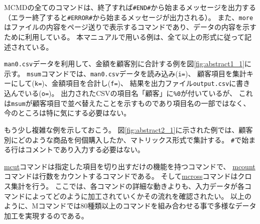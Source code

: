 

MCMDの全てのコマンドは、終了すれば\verb|#END#|から始まるメッセージを出力する
（エラー終了すると\verb|#ERROR#|から始まるメッセージが出力される）。
また、\verb|more|はファイルの内容をページ送りで表示するコマンドであり、データの内容を示すために利用している。
本マニュアルで用いる例は、全て以上の形式に従って記述されている。


\verb|man0.csv|データを利用して、金額を顧客別に合計する例を図\ref{fig:abstract1_1}に示す。
\verb|msum|コマンドでは、\verb|man0.csv|データを読み込み(\verb|i=|)、
顧客項目を集計キーにして(\verb|k=|)、金額項目を合計し(\verb|f=|)、
結果を出力ファイル\verb|output.csv|に書き込んでいる(\verb|o=|)。
出力されたCSVの項目名「顧客」に\verb|%0|が付いているが、
これは\verb|msum|が顧客項目で並べ替えたことを示すものであり項目名の一部ではなく、
今のところは特に気にする必要はない。




もう少し複雑な例を示しておこう。
図\ref{fig:abstract2_1}に示された例では、顧客別にどのような商品を何個購入したか、マトリックス形式で集計する。
\verb|#|で始まる行はコメントであり入力する必要はない。


\hyperref[sect:mcut]{mcut}コマンドは指定した項目を切り出すだけの機能を持つコマンドで、
\hyperref[sect:mcount]{mcount}コマンドは行数をカウントするコマンドである。
そして\hyperref[sect:mcross]{mcross}コマンドはクロス集計を行う。
ここでは、各コマンドの詳細な動きよりも、入力データが各コマンドによってどのように加工されていくかその流れを確認されたい。
以上のように、Mコマンドでは80種類以上のコマンドを組み合わせる事で多様なデータ加工を実現するのである。

